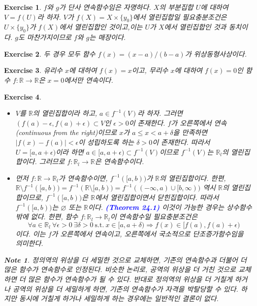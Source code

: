 \documentclass{article}
\newtheorem{exercise}{Exercise}[section]
\newtheorem*{note}{Note}
\newcommand{\R}{\mathbb{R}}
\begin{document}
\begin{exercise}
	\label{exc:18.4}
    $f$와 $g$가 단사 연속함수임은 자명하다. $X$의 부분집합 $U$에 대하여 $V=f(U)$라 하자. $V$가 $f(X)=X\times\{y_0\}$에서 열린집합일 필요충분조건은 $U\times\{y_0\}$가 $f(X)$에서 열린집합인 것이고,이는 $U$가 $X$에서 열린집합인 것과 동치이다. $g$도 마찬가지이므로 $f$와 $g$는 매장이다.
\end{exercise}

\begin{exercise}
    두 경우 모두 함수 $f(x)=(x-a)/(b-a)$가 위상동형사상이다.
\end{exercise}

\begin{exercise}
    유리수 $x$에 대하여 $f(x)=x$이고, 무리수 $x$에 대하여 $f(x)=0$인 함수 $f:\R\to\R$은 $x=0$에서만 연속이다.
\end{exercise}

\begin{exercise}
	\label{exc:18.7}
    \phantom{}
    \begin{itemize}
        \item[(a)] $V$를 $\R$의 열린집합이라 하고, $a\in f^{-1}(V)$라 하자. 그러면 $(f(a)-\epsilon,f(a)+\epsilon)\subset V$인 $\epsilon>0$이 존재한다. $f$가 오른쪽에서 연속(continuous from the right)이므로 $x$가 $a\leq x<a+\delta$을 만족하면 $\vert f(x)-f(a)\vert<\epsilon$이 성립하도록 하는 $\delta>0$이 존재한다. 따라서 $U=[a,a+\epsilon)$이라 하면 $a\in[a,a+\epsilon)\subset f^{-1}(V)$이므로 $f^{-1}(V)$는 $\R_l$의 열린집합이다. 그러므로 $f:\R_l\to\R$은 연속함수이다.
        \item[(b)] 먼저 $f:\R\to\R_l$가 연속함수이면, $f^{-1}([a,b))$가 $\R$의 열린집합이다. 한편, $\R\setminus f^{-1}([a,b))=f^{-1}(\R\setminus[a,b))=f^{-1}((-\infty,a)\cup[b,\infty))$ 역시 $\R$의 열린집합이므로, $f^{-1}([a,b))$은 $\R$에서 열린집합이면서 닫힌집합이다. 따라서 $f^{-1}([a,b))$는 $\varnothing$ 또는 $\R$이다. \textcolor{blue}{\textbf{(Theorem 24.1)}} 이것이 가능한 경우는 상수함수밖에 없다. 한편, 함수 $f:\R_l\to\R_l$이 연속함수일 필요충분조건은
            \begin{equation*}
                \forall a\in\R_l~\forall\epsilon>0~\exists\delta>0~\text{s.t.}~x\in[a,a+\delta)\Longrightarrow f(x)\in[f(a),f(a)+\epsilon)
            \end{equation*}
            이다. 이는 $f$가 오른쪽에서 연속이고, 오른쪽에서 국소적으로 단조증가함수임을 의미한다.
    \end{itemize}
    \begin{note}
        정의역의 위상을 더 세밀한 것으로 교체하면, 기존의 연속함수과 더불어 더 많은 함수가 연속함수로 인정된다. 비슷한 논리로, 공역의 위상을 더 거친 것으로 교체하면 더 많은 함수가 연속함수가 될 수 있다. 반대로 정의역의 위상을 더 거칠게 하거나 공역의 위상을 더 세밀하게 하면, 기존의 연속함수가 자격을 박탈당할 수 있다. 하지만 동시에 거칠게 하거나 세밀하게 하는 경우에는 일반적인 결론이 없다.
    \end{note}
\end{exercise}
\end{document}
